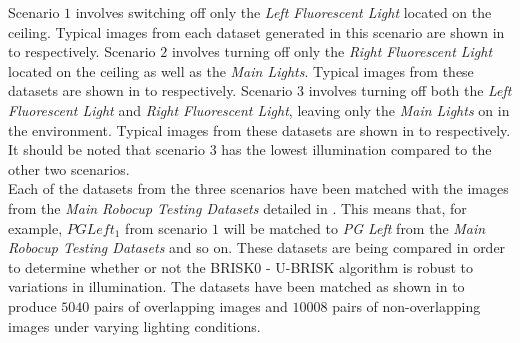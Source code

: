 Scenario $1$ involves switching off only the \textit{Left Fluorescent Light} located on the ceiling. Typical images from each dataset generated in this scenario are shown in  to  respectively. Scenario $2$ involves turning off only the \textit{Right Fluorescent Light} located on the ceiling as well as the \textit{Main Lights}. Typical images from these datasets are shown in  to  respectively. Scenario $3$ involves turning off both the \textit{Left Fluorescent Light} and \textit{Right Fluorescent Light}, leaving only the \textit{Main Lights} on in the environment. Typical images from these datasets are shown in  to  respectively. It should be noted that scenario $3$ has the lowest illumination compared to the other two scenarios. \\

Each of the datasets from the three scenarios have been matched with the images from the \textit{Main Robocup Testing Datasets} detailed in . This means that, for example, \textit{$PG Left_1$} from scenario $1$ will be matched to \textit{PG Left} from the \textit{Main Robocup Testing Datasets} and so on. These datasets are being compared in order to determine whether or not the BRISK0 - U-BRISK algorithm is robust to variations in illumination. The datasets have been matched as shown in  to produce $5040$ pairs of overlapping images and $10008$ pairs of non-overlapping images under varying lighting conditions.\\

